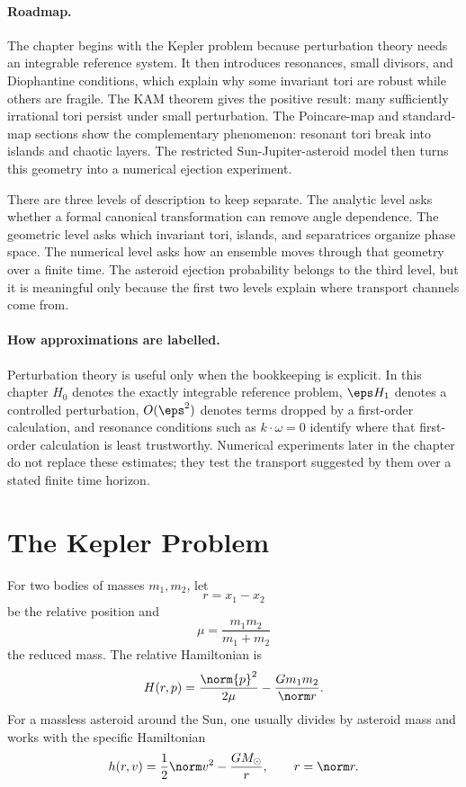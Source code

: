 \paragraph{Roadmap.}
The chapter begins with the Kepler problem because perturbation theory needs an
integrable reference system. It then introduces resonances, small divisors, and
Diophantine conditions, which explain why some invariant tori are robust while
others are fragile. The KAM theorem gives the positive result: many sufficiently
irrational tori persist under small perturbation. The Poincare-map and
standard-map sections show the complementary phenomenon: resonant tori break
into islands and chaotic layers. The restricted Sun-Jupiter-asteroid model then
turns this geometry into a numerical ejection experiment.

There are three levels of description to keep separate. The analytic level asks
whether a formal canonical transformation can remove angle dependence. The
geometric level asks which invariant tori, islands, and separatrices organize
phase space. The numerical level asks how an ensemble moves through that
geometry over a finite time. The asteroid ejection probability belongs to the
third level, but it is meaningful only because the first two levels explain
where transport channels come from.

\paragraph{How approximations are labelled.}
Perturbation theory is useful only when the bookkeeping is explicit. In this
chapter \(H_0\) denotes the exactly integrable reference problem, \(\eps H_1\)
denotes a controlled perturbation, \(O(\eps^2)\) denotes terms dropped by a
first-order calculation, and resonance conditions such as \(k\cdot\omega=0\)
identify where that first-order calculation is least trustworthy. Numerical
experiments later in the chapter do not replace these estimates; they test the
transport suggested by them over a stated finite time horizon.

\section{The Kepler Problem}
\label{sec:kepler-perturbation}

For two bodies of masses \(m_1,m_2\), let
\[
  r=x_1-x_2
\]
be the relative position and
\[
  \mu=\frac{m_1m_2}{m_1+m_2}
\]
the reduced mass. The relative Hamiltonian is
\[
  H(r,p)=\frac{\norm{p}^2}{2\mu}-\frac{Gm_1m_2}{\norm r}.
\]
For a massless asteroid around the Sun, one usually divides by asteroid mass and
works with the specific Hamiltonian
\[
  h(r,v)=\frac12\norm v^2-\frac{GM_\odot}{r},
  \qquad r=\norm r.
\]


